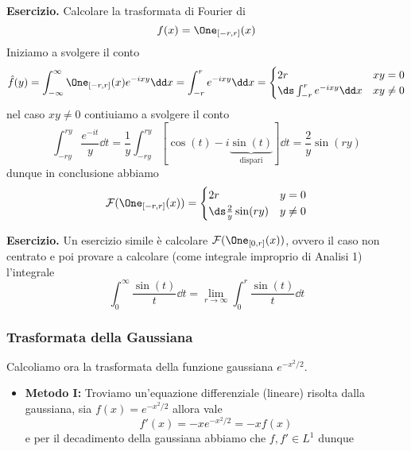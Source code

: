 \textbf{Esercizio.}
Calcolare la trasformata di Fourier di
$$
f(x) = \One_{[-r, r]}(x)
$$
Iniziamo a svolgere il conto
$$
\hat f(y) = \int_{-\infty}^\infty \One_{[-r, r]}(x) e^{-ixy} \dd x = \int_{-r}^r e^{-ixy} \dd x
=
\begin{cases}
	2r & xy=0 \\
	\ds \int_{-r}^r e^{-ixy} \dd x & xy \neq 0 \\
\end{cases}
$$
nel caso $xy \neq 0$ contiuiamo a svolgere il conto
$$
\int_{-ry}^{ry} \frac{e^{-it}}{y} \dd t 
= \frac{1}{y} \int_{-ry}^{ry} [\cos(t) - i\underbrace{\sin(t)}_{\text{dispari}}] \dd t
= \frac{2}{y} \sin(ry)
$$
dunque in conclusione abbiamo
$$
\mathcal F(\One_{[-r, r]}(x)) =
\begin{cases}
	2r & y=0 \\
	\ds \frac{2}{y} \sin(ry) & y \neq 0 \\
\end{cases}
$$

\textbf{Esercizio.}
Un esercizio simile è calcolare $\mathcal F(\One_{[0, r]}(x))$, ovvero il caso non centrato e poi provare a calcolare (come integrale improprio di Analisi 1) l'integrale
$$
\int_{0}^{\infty} \frac{\sin(t)}{t} \dd t = \lim_{r \to \infty}\int_{0}^{r} \frac{\sin(t)}{t} \dd t
$$

\subsubsection{Trasformata della Gaussiana}

Calcoliamo ora la trasformata della funzione gaussiana $e^{-x^2 / 2}$.

\begin{itemize}
	\item \textbf{Metodo I:} Troviamo un'equazione differenziale (lineare) risolta dalla gaussiana, sia $f(x) = e^{-x^2 / 2}$ allora vale
		$$
		f'(x) = -x e^{-x^2/2} = -x f(x)
		$$
		e per il decadimento della gaussiana abbiamo che $f, f' \in L^1$ dunque
\end{itemize}

